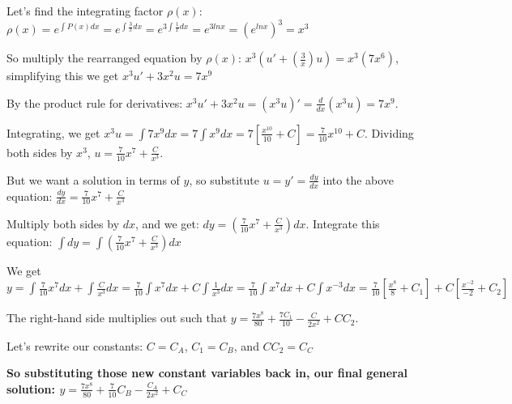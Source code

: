 \documentclass{article}
\begin{document}
\noindent Let's find the integrating factor $\rho(x)$: $\rho(x) = e^{\int P(x)dx} = e^{\int \frac{3}{x}dx} = e^{3 \int \frac{1}{x}dx} = e^{3lnx} = (e^{lnx})^{3} = x^{3}$ \par\vspace{0.25cm}

\noindent So multiply the rearranged equation by $\rho(x)$: $x^{3}(u' + (\frac{3}{x})u) = x^{3}(7x^{6})$, simplifying this we get $x^{3}u' + 3x^{2}u = 7x^{9}$ \par
\noindent By the product rule for derivatives: $x^{3}u' + 3x^{2}u = (x^{3}u)' = \frac{d}{dx}(x^{3}u) = 7x^{9}$.  \par
\noindent Integrating, we get $x^{3}u = \int 7x^{9}dx = 7\int x^{9}dx = 7[\frac{x^{10}}{10} + C] = \frac{7}{10}x^{10} + C$.  Dividing both sides by $x^{3}$, $u = \frac{7}{10}x^{7} + \frac{C}{x^{3}}$. \par\vspace{0.25cm}

\noindent But we want a solution in terms of $y$, so substitute $u = y' = \frac{dy}{dx}$ into the above equation: $\frac{dy}{dx} = \frac{7}{10}x^{7} + \frac{C}{x^{3}}$ \par
\noindent Multiply both sides by $dx$, and we get: $dy = (\frac{7}{10}x^{7} + \frac{C}{x^{3}})dx$.  Integrate this equation: $\int dy = \int (\frac{7}{10}x^{7} + \frac{C}{x^{3}}) dx$ \par
\noindent We get $y = \int \frac{7}{10}x^{7}dx + \int \frac{C}{x^{3}} dx = \frac{7}{10}\int x^{7}dx + C\int \frac{1}{x^{3}}dx = \frac{7}{10}\int x^{7}dx + C\int x^{-3}dx = \frac{7}{10}[\frac{x^{8}}{8} +C_{1}] + C[\frac{x^{-2}}{-2} + C_{2}]$ \par
\noindent The right-hand side multiplies out such that $y = \frac{7x^{8}}{80} + \frac{7C_{1}}{10} - \frac{C}{2x^{2}} + CC_{2}$. \par
\noindent Let's rewrite our constants: $C = C_{A}$, $C_{1} = C_{B}$, and $CC_{2} = C_{C}$ \par\vspace{0.25cm}

\noindent \textbf{So substituting those new constant variables back in, our final general solution: $y = \frac{7x^{8}}{80} + \frac{7}{10}C_{B} - \frac{C_{A}}{2x^{2}} + C_{C}$}
\end{document}
